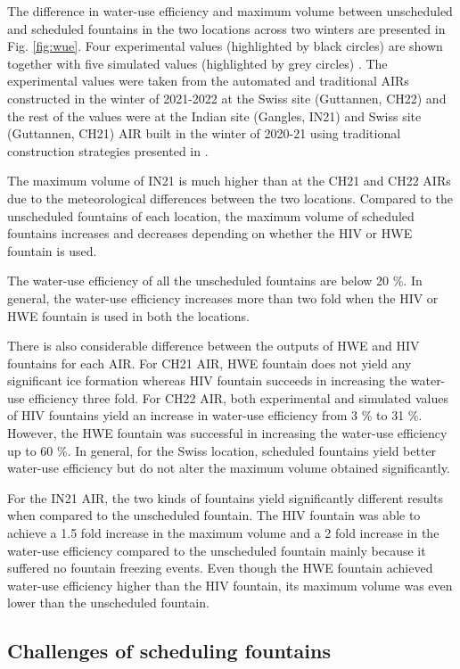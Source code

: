 \documentclass[tc, manuscript]{copernicus}
\begin{document}
The difference in water-use efficiency and maximum volume between unscheduled and scheduled fountains in the two
locations across two winters are presented in Fig. \ref{fig:wue}. Four experimental values (highlighted by black
circles) are shown together with five simulated values (highlighted by grey circles) .  The experimental values
were taken from the automated and traditional AIRs constructed in the winter of 2021-2022 at the Swiss site
(Guttannen, CH22) and the rest of the values were at the Indian site (Gangles, IN21) and Swiss site (Guttannen,
CH21) AIR built in the winter of 2020-21 using traditional construction strategies presented in
\cite{balasubramanianInfluenceMeteorologicalConditions2022}. 

The maximum volume of IN21 is much higher than at the CH21 and CH22 AIRs due to the meteorological differences
between the two locations. Compared to the unscheduled fountains of each location, the maximum volume of 
scheduled fountains increases and decreases depending on whether the HIV or HWE fountain is used. 

The water-use efficiency of all the unscheduled fountains are below 20 \%. In general, the water-use efficiency
increases more than two fold when the HIV or HWE fountain is used in both the locations.  

There is also considerable difference between the outputs of HWE and HIV fountains for each AIR. For CH21 AIR,
HWE fountain does not yield any significant ice formation whereas HIV fountain succeeds in increasing the
water-use efficiency three fold. For CH22 AIR, both experimental and simulated values of HIV fountains
yield an increase in water-use efficiency from 3 \% to 31 \%. However, the HWE fountain was successful in
increasing the water-use efficiency up to 60 \%. In general, for the Swiss location, scheduled fountains yield
better water-use efficiency but do not alter the maximum volume obtained significantly.

For the IN21 AIR, the two kinds of fountains yield significantly different results when compared to the
unscheduled fountain. The HIV fountain was able to achieve a 1.5 fold increase in the maximum volume and a 2
fold increase in the water-use efficiency compared to the unscheduled fountain mainly because it suffered no
fountain freezing events. Even though the HWE fountain achieved water-use efficiency higher than the HIV
fountain, its maximum volume was even lower than the unscheduled fountain.

\subsection{Challenges of scheduling fountains}
\end{document}
